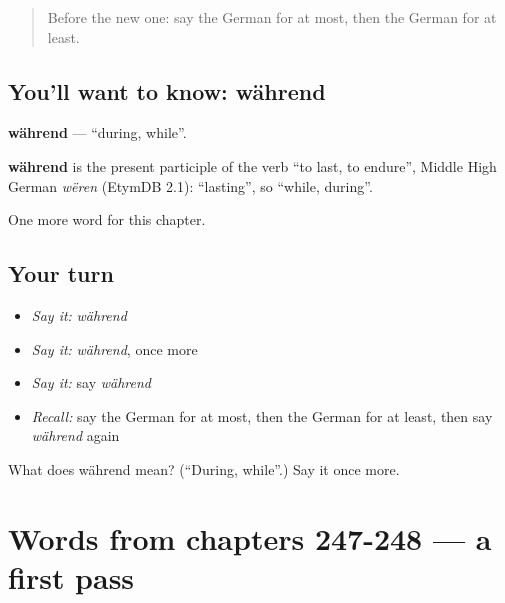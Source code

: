 \label{lesson:GE-C251-waehrend}



\begin{quote}
Before the new one: say the German for at most, then the German for at least.
\end{quote}

\subsection*{You'll want to know: während}
\textbf{während} — \textquotedblleft{}during, while\textquotedblright{}.

\begin{cousinweb}
\textbf{während} is the present participle of the verb \textquotedblleft{}to last, to endure\textquotedblright{}, Middle High German \emph{wëren} (EtymDB 2.1): \textquotedblleft{}lasting\textquotedblright{}, so \textquotedblleft{}while, during\textquotedblright{}.
\end{cousinweb}

\begin{grammarlens}[title={What you've built}]
One more word for this chapter.
\end{grammarlens}

\subsection*{Your turn}
\begin{itemize}
\raggedright
  \item \emph{Say it:} \emph{während}
  \item \emph{Say it:} \emph{während}, once more
  \item \emph{Say it:} say \emph{während}
  \item \emph{Recall:} say the German for at most, then the German for at least, then say \emph{während} again
\end{itemize}

\begin{tcolorbox}[breakable,colback=teal!4,colframe=teal!35!black,title={Before you move on}]
What does während mean? (\textquotedblleft{}During, while\textquotedblright{}.) Say it once more.
\end{tcolorbox}
\section[(dialogue)]{Words from chapters 247-248 — a first pass}

\label{lesson:GE-R251-first-pass-words-from-chapters-247-248}



